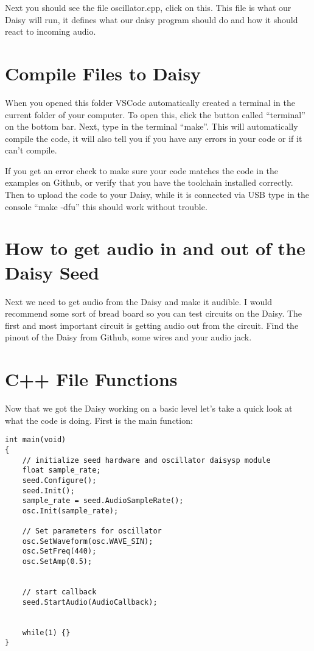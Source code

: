 \documentclass[12pt]{article}
\begin{document}
Next you should see the file oscillator.cpp, click on this. This file is what our Daisy will run, it defines what our daisy program should do and how it should react to incoming audio.


\section{Compile Files to Daisy}

When you opened this folder VSCode automatically created a terminal in the current folder of your computer. To open this, click the button called “terminal” on the bottom bar. Next, type in the terminal “make”. This will automatically compile the code, it will also tell you if you have any errors in your code or if it can’t compile.

If you get an error check to make sure your code matches the code in the examples on Github, or verify that you have the toolchain installed correctly. Then to upload the code to your Daisy, while it is connected via USB type in the console “make -dfu” this should work without trouble.


\section{How to get audio in and out of the Daisy Seed}
Next we need to get audio from the Daisy and make it audible. I would recommend some sort of bread board so you can test circuits on the Daisy. The first and most important circuit is getting audio out from the circuit. Find the pinout of the Daisy from Github, some wires and your audio jack.

\section{C++ File Functions}
Now that we got the Daisy working on a basic level let's take a quick look at what the code is doing. First is the main function:

\begin{lstlisting}
int main(void)
{
    // initialize seed hardware and oscillator daisysp module
    float sample_rate;
    seed.Configure();
    seed.Init();
    sample_rate = seed.AudioSampleRate();
    osc.Init(sample_rate);

    // Set parameters for oscillator
    osc.SetWaveform(osc.WAVE_SIN);
    osc.SetFreq(440);
    osc.SetAmp(0.5);


    // start callback
    seed.StartAudio(AudioCallback);


    while(1) {}
}

\end{lstlisting}
\end{document}

